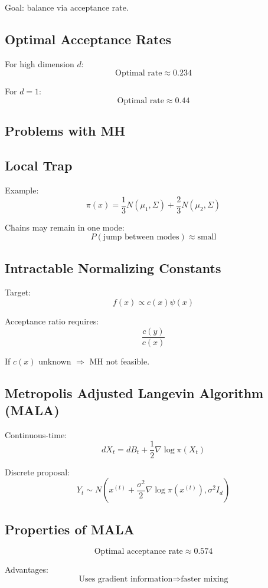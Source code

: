\documentclass[12pt,oneside]{book}
\numberwithin{equation}{section}
\theoremstyle{definition}
\theoremstyle{plain}
\theoremstyle{remark}
\begin{document}
Goal: balance via acceptance rate.

\subsection*{Optimal Acceptance Rates}

For high dimension $d$:
\[
\text{Optimal rate} \approx 0.234
\]

For $d=1$:
\[
\text{Optimal rate} \approx 0.44
\]

\subsection*{Problems with MH}

\subsection*{Local Trap}

Example:
\[
\pi(x) = \frac{1}{3} N(\mu_1,\Sigma) + \frac{2}{3} N(\mu_2,\Sigma)
\]

Chains may remain in one mode:
\[
P(\text{jump between modes}) \approx \text{small}
\]

\subsection*{Intractable Normalizing Constants}

Target:
\[
f(x) \propto c(x)\psi(x)
\]

Acceptance ratio requires:
\[
\frac{c(y)}{c(x)}
\]

If $c(x)$ unknown $\Rightarrow$ MH not feasible.

\subsection{Metropolis Adjusted Langevin Algorithm (MALA)}

Continuous-time:
\[
dX_t = dB_t + \frac{1}{2} \nabla \log \pi(X_t)
\]

Discrete proposal:
\[
Y_t \sim N\left(x^{(t)} + \frac{\sigma^2}{2} \nabla \log \pi(x^{(t)}), \sigma^2 I_d \right)
\]

\subsection*{Properties of MALA}

\[
\text{Optimal acceptance rate} \approx 0.574
\]

Advantages:
\[
\text{Uses gradient information} \Rightarrow \text{faster mixing}
\]
\end{document}
